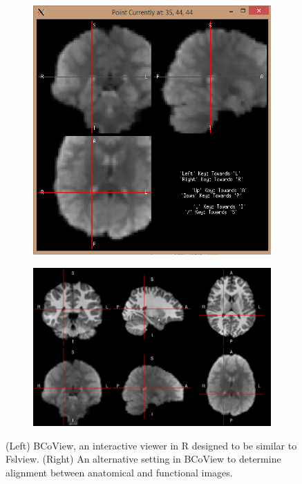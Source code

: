 \documentclass{nature}
\begin{document}
\begin{figure}
\centering
\begin{subfigure}{.5\textwidth}
  \centering
 
\includegraphics[width=.9\linewidth]{fig/brainconductor/50002_smooth_after.png}
\end{subfigure}%
\begin{subfigure}{.5\textwidth}
  \centering
 
\includegraphics[width=.9\linewidth]{fig/brainconductor/50002_ventricles_20151225.png}
\end{subfigure}
\caption{(Left) BCoView, an interactive viewer in R designed to be similar to
Fslview. (Right) An alternative setting 
in BCoView to determine alignment between anatomical and functional images.
}
\label{fig:viewer}
\end{figure}
\end{document}
